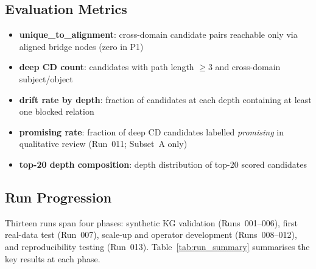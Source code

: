 \subsection{Evaluation Metrics}

\begin{itemize}[noitemsep]
  \item \textbf{unique\_to\_alignment}: cross-domain candidate pairs reachable
    only via aligned bridge nodes (zero in P1)
  \item \textbf{deep CD count}: candidates with path length $\geq 3$ and
    cross-domain subject/object
  \item \textbf{drift rate by depth}: fraction of candidates at each depth
    containing at least one blocked relation
  \item \textbf{promising rate}: fraction of deep CD candidates labelled
    \textit{promising} in qualitative review (Run~011; Subset~A only)
  \item \textbf{top-20 depth composition}: depth distribution of top-20 scored candidates
\end{itemize}

\subsection{Run Progression}
\label{sec:runs}

Thirteen runs span four phases: synthetic KG validation (Runs~001--006),
first real-data test (Run~007), scale-up and operator development
(Runs~008--012), and reproducibility testing (Run~013).
Table~\ref{tab:run_summary} summarises the key results at each phase.

